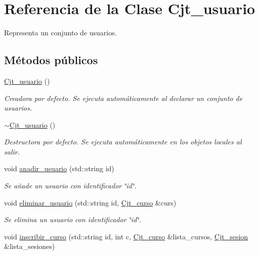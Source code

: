 \hypertarget{class_cjt__usuario}{}\section{Referencia de la Clase Cjt\+\_\+usuario}
\label{class_cjt__usuario}


Representa un conjunto de usuarios.  


\subsection*{Métodos públicos}
\begin{DoxyCompactItemize}
\item 
\mbox{\hyperlink{class_cjt__usuario_aa14539b3419a33c42158996d16cdcf2f}{Cjt\+\_\+usuario}} ()
\begin{DoxyCompactList}\small\item\em Creadora por defecto. Se ejecuta automáticamente al declarar un conjunto de usuarios. \end{DoxyCompactList}\item 
\mbox{\hyperlink{class_cjt__usuario_a5ce2decc4b973b8c687ef991b376bed2}{$\sim$\+Cjt\+\_\+usuario}} ()
\begin{DoxyCompactList}\small\item\em Destructora por defecto. Se ejecuta automáticamente en los objetos locales al salir. \end{DoxyCompactList}\item 
void \mbox{\hyperlink{class_cjt__usuario_a1a587cd6e8e3f261f27981134d0216e5}{anadir\+\_\+usuario}} (std\+::string id)
\begin{DoxyCompactList}\small\item\em Se añade un usuario con identificador \char`\"{}id\char`\"{}. \end{DoxyCompactList}\item 
void \mbox{\hyperlink{class_cjt__usuario_a4be0bd7bbca32d299b152730d6de41ba}{eliminar\+\_\+usuario}} (std\+::string id, \mbox{\hyperlink{class_cjt__curso}{Cjt\+\_\+curso}} \&curs)
\begin{DoxyCompactList}\small\item\em Se elimina un usuario con identificador \char`\"{}id\char`\"{}. \end{DoxyCompactList}\item 
void \mbox{\hyperlink{class_cjt__usuario_a3f4be6c8f5568ef3767bf343418e6f5d}{inscribir\+\_\+curso}} (std\+::string id, int c, \mbox{\hyperlink{class_cjt__curso}{Cjt\+\_\+curso}} \&lista\+\_\+cursos, \mbox{\hyperlink{class_cjt__sesion}{Cjt\+\_\+sesion}} \&lista\+\_\+sesiones)

\end{DoxyCompactItemize}
